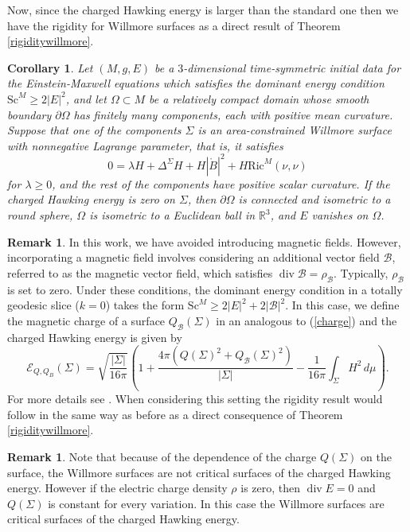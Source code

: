 \documentclass[12pt,a4paper]{amsart}
\theoremstyle{plain}
\newtheorem{corollary}[theorem]{Corollary}
\theoremstyle{definition}
\newtheorem{remark}[theorem]{Remark}
\newcommand{\diver}{\operatorname{div}}
\begin{document}
Now, since the charged Hawking energy is larger than the standard one then we have the rigidity for Willmore surfaces as a direct result of Theorem
\ref{rigiditywillmore}.
\begin{corollary}\label{coroelec}
  Let $(M,g,E)$ be a $3$-dimensional time-symmetric initial data for the Einstein-Maxwell equations  which satisfies the dominant energy condition $ \mathrm{Sc}^M \geq 2 |E|^2$,   and let  $\Omega \subset M$ be a relatively compact domain whose smooth boundary  $\partial \Omega $  has finitely many components, each with positive mean curvature.  Suppose that one of the components $\Sigma $ is an area-constrained Willmore surface with  nonnegative Lagrange parameter, that is, it  satisfies
    \begin{equation}
        0= \lambda H  +\Delta^{\Sigma} H + H|\mathring{B}|^2+ H \mathrm{Ric}^M(\nu, \nu)
    \end{equation}
   for $\lambda \geq 0$, and the rest of the components have positive scalar curvature.  If the charged Hawking energy is zero on $\Sigma$, then $\partial \Omega$ is connected and isometric to a round sphere, $\Omega$ is isometric to a Euclidean ball in $\mathbb{R}^3$, and $ E$ vanishes  on $\Omega$.  
\end{corollary}
\begin{remark}\label{chargeremark}
In this work, we have avoided introducing magnetic fields. However, incorporating a magnetic field involves considering an additional vector field $\mathcal{B}$, referred to as the magnetic vector field, which satisfies $\diver \mathcal{B} =\rho_\mathcal{B}$. Typically, 
$\rho_\mathcal{B} $ is set to zero. Under these conditions, the dominant energy condition in a totally geodesic slice ($k=0$) takes the form $ \mathrm{Sc}^M \geq 2 |E|^2 +2|\mathcal{B}|^2$.  In this case, we define the magnetic charge of a
surface $Q_\mathcal{B}(\Sigma)$ in an analogous to (\ref{charge}) and the charged Hawking energy is given by 
$$\mathcal{E}_{Q,Q_B}(\Sigma) = \sqrt{\frac{|\Sigma|}{16\pi}} 
\left( 
1 + \frac{4\pi (Q(\Sigma)^2 +Q_\mathcal{B}(\Sigma)^2 )}{|\Sigma|} 
- \frac{1}{16\pi} \int_{\Sigma} H^2 \, d\mu 
\right). $$
For   more details see \cite[Appendix A]{mccormick2019charged}. When considering this setting  the rigidity result would follow in the same way as before as a direct consequence of Theorem \ref{rigiditywillmore}.
\end{remark}
\begin{remark}
    Note that because of the dependence of  the charge $Q(\Sigma)$ on the surface, the Willmore surfaces are not critical surfaces of the charged  Hawking energy. However if  the electric charge density $\rho$ is zero, then $\diver E =0$ and   $Q(\Sigma)$ is constant for every variation. In this case the Willmore surfaces are critical surfaces of the 
charged  Hawking energy.
\end{remark}
\end{document}
